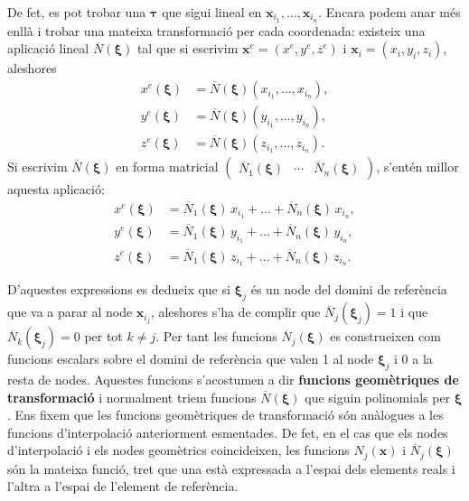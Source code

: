\documentclass{article}
\begin{document}
De fet, es pot trobar una $\boldsymbol{\tau}$ que sigui lineal en $\boldsymbol{x}_{i_1},\ldots,\boldsymbol{x}_{i_n}$. Encara podem anar m\'{e}s enll\`{a} i trobar una mateixa transformaci\'{o} per cada coordenada: existeix una aplicaci\'{o} lineal $\overline{N}(\boldsymbol{\xi})$ tal que si escrivim $\boldsymbol{x}^e=(x^e,y^e,z^e)$ i $\boldsymbol{x}_i=(x_i,y_i,z_i)$, aleshores
\begin{align*}
x^e(\boldsymbol{\xi})&=\overline{N}(\boldsymbol{\xi})(x_{i_1},\ldots,x_{i_n}),\\
y^e(\boldsymbol{\xi})&=\overline{N}(\boldsymbol{\xi})(y_{i_1},\ldots,y_{i_n}),\\
z^e(\boldsymbol{\xi})&=\overline{N}(\boldsymbol{\xi})(z_{i_1},\ldots,z_{i_n}).
\end{align*}
Si escrivim $\overline{N}(\boldsymbol{\xi})$ en forma matricial $\left(\begin{matrix}\overline{N}_1(\boldsymbol{\xi})&\cdots&\overline{N}_n(\boldsymbol{\xi})\end{matrix}\right)$, s'ent\'{e}n millor aquesta aplicaci\'{o}:
\begin{align*}
x^e(\boldsymbol{\xi})&=\overline{N}_1(\boldsymbol{\xi})\,x_{i_1}+\ldots+\overline{N}_n(\boldsymbol{\xi})\,x_{i_n},\\
y^e(\boldsymbol{\xi})&=\overline{N}_1(\boldsymbol{\xi})\,y_{i_1}+\ldots+\overline{N}_n(\boldsymbol{\xi})\,y_{i_n},\\
z^e(\boldsymbol{\xi})&=\overline{N}_1(\boldsymbol{\xi})\,z_{i_1}+\ldots+\overline{N}_n(\boldsymbol{\xi})\,z_{i_n}.
\end{align*}

D'aquestes expressions es dedueix que si $\boldsymbol{\xi}_j$ \'{e}s un node del domini de refer\`{e}ncia que va a parar al node $\boldsymbol{x}_{i_j}$, aleshores s'ha de complir que $\overline{N}_j(\boldsymbol{\xi}_j)=1$ i que $\overline{N}_k(\boldsymbol{\xi}_j)=0$ per tot $k\neq j$. Per tant les funcions $\overline{N}_j(\boldsymbol{\xi})$ es construeixen com funcions escalars sobre el domini de refer\`{e}ncia que valen 1 al node $\boldsymbol{\xi}_j$ i 0 a la resta de nodes. Aquestes funcions s'acostumen a dir \textbf{funcions geom\`{e}triques de transformaci\'{o}} i normalment triem funcions $\overline{N}(\boldsymbol{\xi})$ que siguin polinomials per $\boldsymbol{\xi}$. Ens fixem que les funcions geom\`{e}triques de transformaci\'{o} s\'{o}n an\`{a}logues a les funcions d'interpolaci\'{o} anteriorment esmentades. De fet, en el cas que els nodes d'interpolaci\'{o} i els nodes geom\`{e}trics coincideixen, les funcions $N_j(\boldsymbol{x})$ i $\overline{N}_j(\boldsymbol{\xi})$ s\'{o}n la mateixa funci\'{o}, tret que una est\`{a} expressada a l'espai dels elements reals i l'altra a l'espai de l'element de refer\`{e}ncia.
\end{document}
